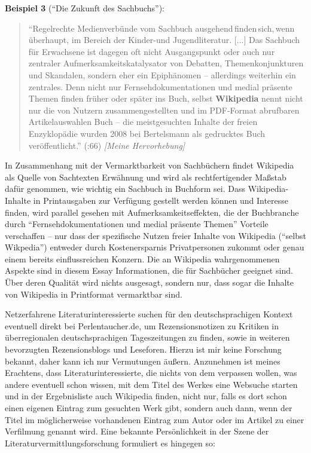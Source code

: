 \documentclass[fontsize=12pt]{scrartcl}
\begin{document}
\textbf{Beispiel 3} ("`Die Zukunft des Sachbuchs"'):
\singlespacing
\begin{quote}
"`Regelrechte Medienverb\"unde vom Sachbuch ausgehend\,fin\-den\,sich,\,wenn \"uber\-haupt, im \mbox{Bereich} der Kinder-und Jugendli\-te\-ra\-tur. [...] Das Sachbuch f\"ur Erwachsene ist dagegen oft nicht Ausgangspunkt oder auch nur zentraler Aufmerksamkeitskatalysator von Debatten, Themenkonjunkturen und Skandalen, sondern eher ein Epiph\"anomen -- al\-ler\-dings wei\-ter\-hin ein zentrales. Denn nicht nur Fernsehdokumentationen und medial pr\"asente Themen finden fr\"uher oder sp\"ater ins Buch, \mbox{selbst} \textbf{Wi\-ki\-pe\-dia} \mbox{nennt} nicht nur die von Nutzern zusammengestellten und im PDF-Format abrufbaren Artikelauswahlen \flq Buch\frq \,\,-- die \flq meist\-ge\-such\-ten Inhalte der freien Enzyklop\"adie\frq \,\,wurden 2008 bei Bertelsmann als gedrucktes Buch ver\"of\-fent\-licht."' (\cite{Oels2013}:66) \textit{[Meine Hervorhebung]}
\end{quote}
\onehalfspacing

In Zusammenhang mit der Vermarktbarkeit von Sachb\"uchern findet Wi\-ki\-pe\-dia als Quelle von Sachtexten Erw\"ahnung und wird als rechtfertigender Ma{\ss}stab daf\"ur genommen, wie wichtig ein Sachbuch in Buchform sei. Dass Wi\-ki\-pe\-dia-Inhalte in Printausgaben zur Verf\"ugung gestellt werden k\"onnen und Interesse finden, wird pa\-ral\-lel gesehen mit Aufmerksamkeitseffekten, die der Buchbranche durch "`Fern\-seh\-do\-kumentationen und medial pr\"asente Themen"' Vorteile verschaffen -- nur dass der spezifische Nutzen freier Inhalte von Wi\-ki\-pe\-dia ("`\mbox{selbst} Wikpedia"') entweder durch Kostenersparnis Privatper\-so\-nen zukommt oder genau einem bereits ein\-fluss\-rei\-chen Konzern. Die an Wi\-ki\-pe\-dia wahrgenommenen Aspekte sind in diesem Essay Informationen, die f\"ur Sachb\"ucher ge\-eig\-net sind. \"Uber deren Qualit\"at wird nichts ausgesagt, sondern nur, dass sogar die Inhalte von Wi\-ki\-pe\-dia in Printformat vermarktbar sind.

Netzerfahrene Li\-te\-ra\-tur\-interessierte suchen f\"ur den deutschspra\-chi\-gen Kontext even\-tuell direkt bei Per\-len\-tau\-cher.de, um Rezensionsnotizen zu Kritiken in \"uberregiona\-len deutschspra\-chi\-gen Tageszeitungen zu finden, sowie in weiteren bevorzugten Rezensionsblogs und Leseforen. Hierzu ist mir keine For\-schung bekannt, daher kann ich nur Vermutungen \"au{\ss}ern. Anzunehmen ist meines Erachtens, dass Li\-te\-ra\-tur\-interessierte, die nichts von dem verpassen wollen, was andere eventuell schon wissen, mit dem Titel des Werkes eine Websuche starten und in der Ergebnisliste auch Wi\-ki\-pe\-dia finden, nicht nur, falls es dort schon einen eigenen Eintrag zum gesuchten Werk gibt, sondern auch dann, wenn der Titel im m\"oglicherweise vorhandenen Eintrag zum Autor\textsuperscript{\tiny *} oder im Artikel zu einer Verfilmung genannt wird. Eine bekannte Pers\"onlichkeit in der Szene der Li\-te\-ra\-tur\-ver\-mitt\-lungsfor\-schung formuliert es hingegen so:
\end{document}
